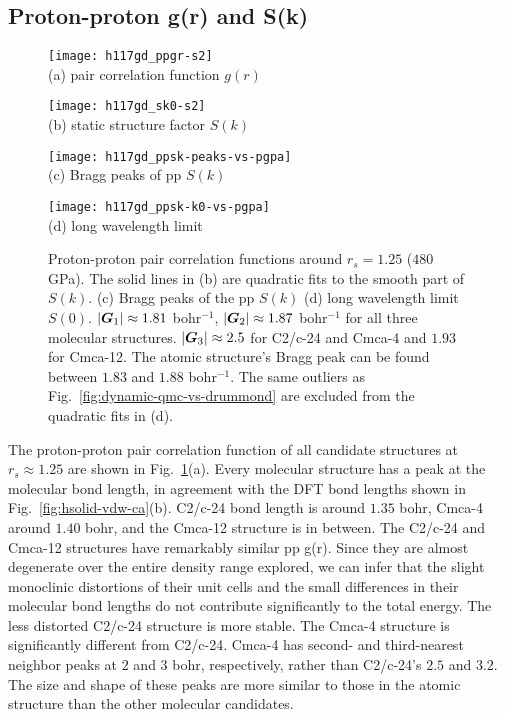 \subsection{Proton-proton g(r) and S(k)}

\begin{figure}[h]
\centering
\begin{minipage}{0.49\textwidth}
\centering
\texttt{[image: h117gd\_ppgr-s2]}\\
(a) pair correlation function $g(r)$
\end{minipage}
\begin{minipage}{0.49\textwidth}
\centering
\texttt{[image: h117gd\_sk0-s2]}\\
(b) static structure factor $S(k)$
\end{minipage}
\centering
\begin{minipage}{0.49\textwidth}
\centering
\texttt{[image: h117gd\_ppsk-peaks-vs-pgpa]}\\
(c) Bragg peaks of pp $S(k)$
\end{minipage}
\begin{minipage}{0.49\textwidth}
\centering
\texttt{[image: h117gd\_ppsk-k0-vs-pgpa]}\\
(d) long wavelength limit
\end{minipage}
\caption{Proton-proton pair correlation functions around $r_s=1.25$ ($480$ GPa). The solid lines in (b) are quadratic fits to the smooth part of $S(k)$. (c) Bragg peaks of the pp $S(k)$ (d) long wavelength limit $S(0)$.  $\vert\boldsymbol{G}_1\vert\approx 1.81$ bohr$^{-1}$, $\vert\boldsymbol{G}_2\vert\approx 1.87$ bohr$^{-1}$ for all three molecular structures. $\vert\boldsymbol{G}_3\vert\approx 2.5$ for C2/c-24 and Cmca-4 and $1.93$ for Cmca-12. The atomic structure's Bragg peak can be found between $1.83$ and $1.88$ bohr$^{-1}$. The same outliers as Fig.~\ref{fig:dynamic-qmc-vs-drummond} are excluded from the quadratic fits in (d).}
\label{fig:hsolid-ppgrsk}
\end{figure}

The proton-proton pair correlation function of all candidate structures at $r_s\approx1.25$ are shown in Fig.~\ref{fig:hsolid-ppgrsk}(a).
Every molecular structure has a peak at the molecular bond length, in agreement with the DFT bond lengths shown in Fig.~\ref{fig:hsolid-vdw-ca}(b).
C2/c-24 bond length is around $1.35$ bohr, Cmca-4 around $1.40$ bohr, and the Cmca-12 structure is in between.
The C2/c-24 and Cmca-12 structures have remarkably similar pp g(r).
Since they are almost degenerate over the entire density range explored, we can infer that the slight monoclinic distortions of their unit cells and the small differences in their molecular bond lengths do not contribute significantly to the total energy.
The less distorted C2/c-24 structure is more stable.
The Cmca-4 structure is significantly different from C2/c-24. Cmca-4 has second- and third-nearest neighbor peaks at $2$ and $3$ bohr, respectively, rather than C2/c-24's $2.5$ and $3.2$. The size and shape of these peaks are more similar to those in the atomic structure than the other molecular candidates.

